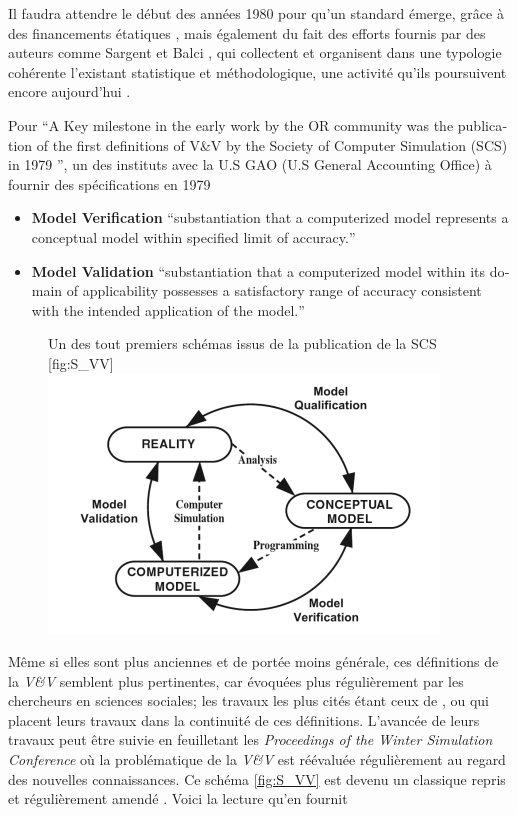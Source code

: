 Il faudra attendre le début des années 1980 pour qu'un standard émerge, grâce à des financements étatiques \autocite{Balci1986}, mais également du fait des efforts fournis par des auteurs comme Sargent et Balci \autocite{Nance2002}, qui collectent et organisent dans une typologie cohérente l'existant statistique et méthodologique, une activité qu'ils poursuivent encore aujourd'hui \autocite{Balci1998}.

Pour \autocite[22]{Oberkampf2010} \foreignquote{english}{A Key milestone in the early work by the OR community was the publication of the first definitions of V\&V by the Society of Computer Simulation (SCS) in 1979 \autocite{Schlesinger1979}}, un des instituts avec la U.S GAO (U.S General Accounting Office) à fournir des spécifications en 1979 \autocite{Balci1986}

\begin{itemize}
\item \textbf{Model Verification} \foreignquote{english}{substantiation that a computerized model represents a conceptual model within specified limit of accuracy.}
\item \textbf{Model Validation} \foreignquote{english}{substantiation that a computerized model within its domain of applicability possesses a satisfactory range of accuracy consistent with the intended application of the model.}
\end{itemize}

\begin{figure}[h]
\begin{sidecaption}[fortoc]{Un des tout premiers schémas issus de la publication de la SCS \autocite{Oberkampf2010,Schlesinger1979}}[fig:S_VV]
  \centering
 \includegraphics[width=.7\linewidth]{schelinger_schema1979.png}
  \end{sidecaption}
\end{figure}

Même si elles sont plus anciennes et de portée moins générale, ces définitions de la \textit{V\&V} semblent plus pertinentes, car évoquées plus régulièrement par les chercheurs en sciences sociales; les travaux les plus cités étant ceux de \textcite{Kleijnen1995}, ou \textcite{Sargent2010} qui placent leurs travaux dans la continuité de ces définitions. L'avancée de leurs travaux peut être suivie en feuilletant les \textit{Proceedings of the Winter Simulation Conference} où la problématique de la \textit{V\&V} est réévaluée régulièrement au regard des nouvelles connaissances. Ce schéma \ref{fig:S_VV} est devenu un classique repris et régulièrement amendé \autocite{Sargent2010}. Voici la lecture qu'en fournit \autocite{Oberkampf2010}

